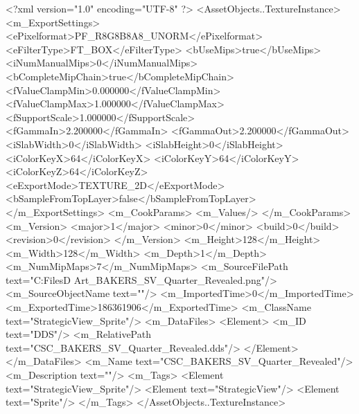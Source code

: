 <?xml version="1.0" encoding="UTF-8" ?>
<AssetObjects..TextureInstance>
	<m_ExportSettings>
		<ePixelformat>PF_R8G8B8A8_UNORM</ePixelformat>
		<eFilterType>FT_BOX</eFilterType>
		<bUseMips>true</bUseMips>
		<iNumManualMips>0</iNumManualMips>
		<bCompleteMipChain>true</bCompleteMipChain>
		<fValueClampMin>0.000000</fValueClampMin>
		<fValueClampMax>1.000000</fValueClampMax>
		<fSupportScale>1.000000</fSupportScale>
		<fGammaIn>2.200000</fGammaIn>
		<fGammaOut>2.200000</fGammaOut>
		<iSlabWidth>0</iSlabWidth>
		<iSlabHeight>0</iSlabHeight>
		<iColorKeyX>64</iColorKeyX>
		<iColorKeyY>64</iColorKeyY>
		<iColorKeyZ>64</iColorKeyZ>
		<eExportMode>TEXTURE_2D</eExportMode>
		<bSampleFromTopLayer>false</bSampleFromTopLayer>
	</m_ExportSettings>
	<m_CookParams>
		<m_Values/>
	</m_CookParams>
	<m_Version>
		<major>1</major>
		<minor>0</minor>
		<build>0</build>
		<revision>0</revision>
	</m_Version>
	<m_Height>128</m_Height>
	<m_Width>128</m_Width>
	<m_Depth>1</m_Depth>
	<m_NumMipMaps>7</m_NumMipMaps>
	<m_SourceFilePath text="C:\Users\Shadow\Desktop\Working Files\2D Art\Quarters\Bakers\StrategicView\CSC_BAKERS_SV_Quarter_Revealed.png"/>
	<m_SourceObjectName text=""/>
	<m_ImportedTime>0</m_ImportedTime>
	<m_ExportedTime>186361906</m_ExportedTime>
	<m_ClassName text="StrategicView_Sprite"/>
	<m_DataFiles>
		<Element>
			<m_ID text="DDS"/>
			<m_RelativePath text="CSC_BAKERS_SV_Quarter_Revealed.dds"/>
		</Element>
	</m_DataFiles>
	<m_Name text="CSC_BAKERS_SV_Quarter_Revealed"/>
	<m_Description text=""/>
	<m_Tags>
		<Element text="StrategicView_Sprite"/>
		<Element text="StrategicView"/>
		<Element text="Sprite"/>
	</m_Tags>
</AssetObjects..TextureInstance>

